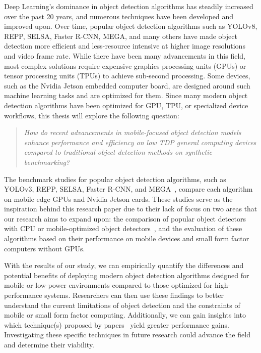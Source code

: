 \documentclass[10pt,twocolumn,letterpaper]{article}
\begin{document}
Deep Learning's dominance in object detection algorithms has steadily increased over the past 20 years, and numerous techniques have been developed and improved upon.
Over time, popular object detection algorithms such as YOLOv8, REPP, SELSA, Faster R-CNN, MEGA, and many others have made object detection more efficient and less-resource intensive at higher image resolutions and video frame rate.
While there have been many advancements in this field, most complex solutions require expensive graphics processing units (GPUs) or tensor processing units (TPUs) to achieve sub-second processing.
Some devices, such as the Nvidia Jetson embedded computer board, are designed around such machine learning tasks and are optimized for them.
Since many modern object detection algorithms have been optimized for GPU, TPU, or specialized device workflows, this thesis will explore the following question:
\begin{quote}
    \textit{How do recent advancements in mobile-focused object detection models enhance performance and efficiency on low TDP general computing devices compared to traditional object detection methods on synthetic benchmarking?}
\end{quote}

The benchmark studies for popular object detection algorithms, such as YOLOv3, REPP, SELSA, Faster R-CNN, and MEGA~\cite{lee2021benchmarking,li2019object}, compare each algorithm on mobile edge GPUs and Nvidia Jetson cards.
These studies serve as the inspiration behind this research paper due to their lack of focus on two areas that our research aims to expand upon: the comparison of popular object detectors with CPU or mobile-optimized object detectors~\cite{chen2022mobileformer,honegger2014real,liu2019edge,ganesh2022yoloret,xiong2021mobiledets,li2021npas,qin2019thundernet,mao2016real,ullah2020cpu}, and the evaluation of these algorithms based on their performance on mobile devices and small form factor computers without GPUs.

With the results of our study, we can empirically quantify the differences and potential benefits of deploying modern object detection algorithms designed for mobile or low-power environments compared to those optimized for high-performance systems. Researchers can then use these findings to better understand the current limitations of object detection and the constraints of mobile or small form factor computing. Additionally, we can gain insights into which technique(s) proposed by papers~\cite{chen2022mobileformer,honegger2014real,liu2019edge,ganesh2022yoloret,xiong2021mobiledets,li2021npas,qin2019thundernet,mao2016real,ullah2020cpu} yield greater performance gains. Investigating these specific techniques in future research could advance the field and determine their viability.
\end{document}
